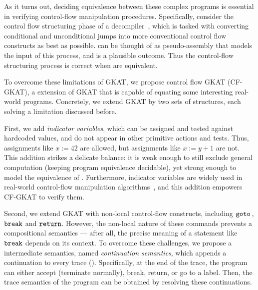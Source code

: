 As it turns out, deciding equivalence between these complex programs is essential in verifying control-flow manipulation procedures.
Specifically, consider the control flow structuring phase of a decompiler~\cite{cifuentes-1994}, which is tasked with converting conditional and unconditional jumps into more conventional control flow constructs as best as possible.
 can be thought of as pseudo-assembly that models the input of this process, and  is a plausible outcome.
Thus the control-flow structuring process is correct when  are equivalent.

To overcome these limitations of GKAT, we propose control flow GKAT (CF-GKAT), a extension of GKAT that is capable of equating some interesting real-world programs.
Concretely, we extend GKAT by two sets of structures, each solving a limitation discussed before.

First, we add \emph{indicator variables}, which can be assigned and tested against hardcoded values, and do not appear in other primitive actions and tests.
Thus, assignments like $x := 42$ are allowed, but assignments like $x := y + 1$ are not.
This addition strikes a delicate balance: it is weak enough to still exclude general computation (keeping program equivalence decidable), yet strong enough to model the equivalence of .
Furthermore, indicator variables are widely used in real-world control-flow manipulation algorithms~\cite{yakdan_NoMoreGotos_2015,erosa-hendren-1994}, and this addition empowers CF-GKAT to verify them. 

Second, we extend GKAT with non-local control-flow constructs, including \(\mathtt{goto}~\!\), \(\mathtt{break}\) and \(\mathtt{return}\).
However, the non-local nature of these commands prevents a compositional semantics --- after all, the precise meaning of a statement like \(\mathtt{break}\) depends on its context.
To overcome these challenges, we propose a intermediate semantics, named \emph{continuation semantics}, which appends a continuation to every trace (). 
Specifically, at the end of the trace, the program can either accept (terminate normally), break, return, or go to a label.
Then, the trace semantics of the program can be obtained by resolving these continuations.


